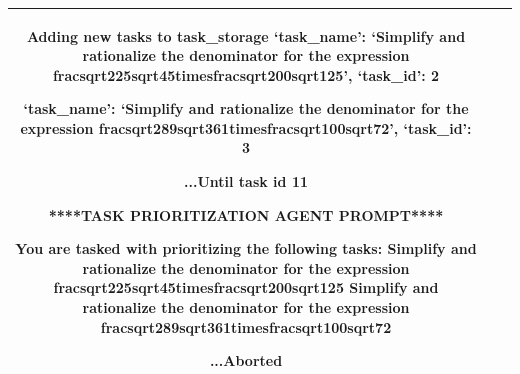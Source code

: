 \begin{table}[h!]
\begin{tabular}{c|c|p{11cm}}
Adding new tasks to task\_storage
{`task\_name': `Simplify and rationalize the denominator for the expression fracsqrt225sqrt45timesfracsqrt200sqrt125', `task\_id': 2}

{`task\_name': `Simplify and rationalize the denominator for the expression fracsqrt289sqrt361timesfracsqrt100sqrt72', `task\_id': 3}

\textbf{...Until task id 11}

****TASK PRIORITIZATION AGENT PROMPT****

You are tasked with prioritizing the following tasks: 
Simplify and rationalize the denominator for the expression fracsqrt225sqrt45timesfracsqrt200sqrt125
Simplify and rationalize the denominator for the expression fracsqrt289sqrt361timesfracsqrt100sqrt72

\textbf{...Aborted}
   \\
\bottomrule
\end{tabular}
\end{table}


